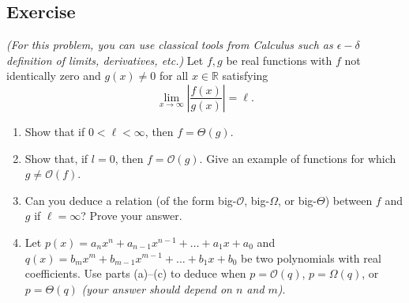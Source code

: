 \documentclass{article}
\newcounter{counter}
\newcommand{\Exercise}{Exercise \stepcounter{counter}\thecounter}
\begin{document}
\subsection*{\Exercise}
    \textit{(For this problem, you can use classical tools from Calculus such as $\epsilon-\delta$ definition of limits, derivatives, etc.)} Let $f, g$ be real functions with $f$ not identically zero and $g(x) \ne 0$ for all $x \in \mathbb{R}$ satisfying $$\lim_{x \rightarrow \infty} \left|\frac{f(x)}{g(x)}\right| = \ell.$$
    \begin{enumerate}
        \item Show that if $0 < \ell < \infty$, then $f = \Theta(g)$.
        \item Show that, if $l = 0$, then $f = \mathcal{O}(g)$. Give an example of functions for which $g \ne \mathcal{O}(f)$.
        \item Can you deduce a relation (of the form big-$\mathcal{O}$, big-$\Omega$, or big-$\Theta$) between $f$ and $g$ if $\ell = \infty$? Prove your answer.
        \item Let $p(x) = a_{n}x^{n} + a_{n - 1}x^{n - 1} + \dots + a_{1}x + a_{0}$ and $q(x) = b_{m}x^{m} + b_{m - 1}x^{m - 1} + \dots + b_{1}x + b_{0}$ be two polynomials with real coefficients. Use parts (a)--(c) to deduce when $p = \mathcal{O}(q)$, $p = \Omega(q)$, or $p = \Theta(q)$ \textit{(your answer should depend on $n$ and $m$)}.
    \end{enumerate}
\end{document}
